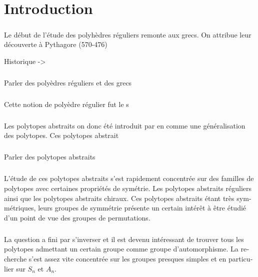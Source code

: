 \chapter*{Introduction}

\begin{otherlanguage}{french}

\paragraph{}
Le début de l'étude des polyhèdres réguliers remonte aux grecs. On attribue leur découverte à Pythagore (570-476)

Historique ->



\paragraph{}
Parler des polyèdres réguliers et des grecs

\paragraph{}
Cette notion de polyèdre régulier fut le s

\paragraph{}
Les polytopes abstraits on donc été introduit par en comme une généralisation des polytopes. Ces polytopes abstrait

\paragraph{}
Parler des polytopes abstraits

\paragraph{}
L'étude de ces polytopes abstraits s'est rapidement concentrée sur des familles de polytopes avec certaines propriétés de symétrie. Les polytopes abstraits réguliers ainsi que les polytopes abstraits chiraux. Ces polytopes abstraits étant très symmétriques, leurs groupes de symmétrie présente un certain intérêt à être étudié d'un point de vue des groupes de permutations.

\paragraph{}
La question a fini par s'inverser et il est devenu intéressant de trouver tous les polytopes admettant un certain groupe comme groupe d'automorphisme. La recherche s'est assez vite concentrée sur les groupes presques simples et en particulier sur $S_n$ et $A_n$.


\end{otherlanguage}
